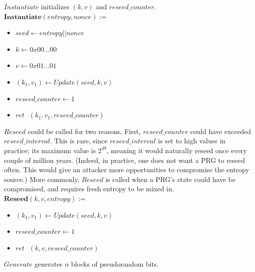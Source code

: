 \documentclass[12pt,lot, lof]{puthesis}
\newenvironment{game}
{ \begin{itemize}[noitemsep,nolistsep] 
}
{ \end{itemize}                  }
\newcommand{\s} {\textrm{ }}
\newcommand{\lar}{\leftarrow}
\begin{document}
$Instantiate$ initializes $(k,v)$ and $reseed\_counter$.  \\

$\textbf{Instantiate}(entropy, nonce) := $
\begin{game}
\item[] $seed \lar entropy || nonce$
\item[] $k \lar 0x00 \ldots 00$
\item[] $v \lar 0x01 \ldots 01$
\item[] $(k_1, v_1) \lar Update(seed, k, v)$
\item[] $reseed\_counter \lar 1$
\item[] $ret \s (k_1, v_1, reseed\_counter)$\\
\end{game}

$Reseed$ could be called for two reasons. First, $reseed\_counter$ could have exceeded $reseed\_interval$. This is rare, since $reseed\_interval$ is set to high values in practice; its maximum value is $2^{48}$, meaning it would naturally reseed once every couple of million years. (Indeed, in practice, one does not want a PRG to reseed often. This would give an attacker more opportunities to compromise the entropy source.) More commonly, $Reseed$ is called when a PRG's state could have be compromised, and requires fresh entropy to be mixed in.\\

$\textbf{Reseed}(k, v, entropy) := $
\begin{game}
\item[] $(k_1, v_1) \lar Update(seed, k, v)$
\item[] $reseed\_counter \lar 1$
\item[] $ret \s (k,v, reseed\_counter)$ \\
\end{game}

$Generate$ generates $n$ blocks of pseudorandom bits.

\end{document}
